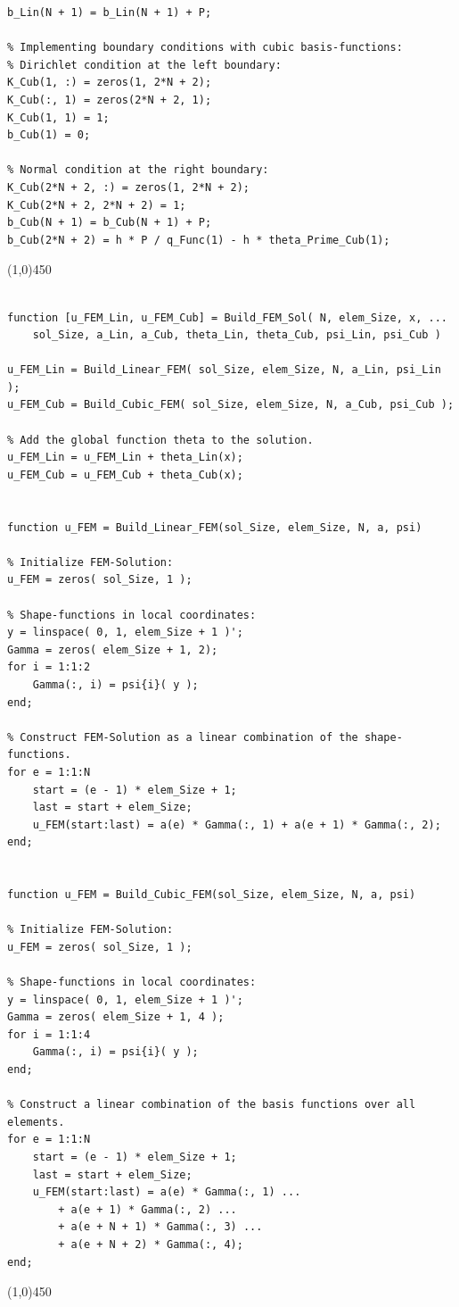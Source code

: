 \begin{lstlisting}[caption = {Setup Equation System}, label = lst:Setup_Eq_Sys]
% Normal condition at the right boundary:       
b_Lin(N + 1) = b_Lin(N + 1) + P;

% Implementing boundary conditions with cubic basis-functions:
% Dirichlet condition at the left boundary:
K_Cub(1, :) = zeros(1, 2*N + 2);
K_Cub(:, 1) = zeros(2*N + 2, 1);
K_Cub(1, 1) = 1;
b_Cub(1) = 0;

% Normal condition at the right boundary:
K_Cub(2*N + 2, :) = zeros(1, 2*N + 2);
K_Cub(2*N + 2, 2*N + 2) = 1;
b_Cub(N + 1) = b_Cub(N + 1) + P;
b_Cub(2*N + 2) = h * P / q_Func(1) - h * theta_Prime_Cub(1);

\end{lstlisting}
\line(1,0){450}
\clearpage

\begin{lstlisting}[caption = {Build up FEM-Solution}, label = lst:Build_Sol]

function [u_FEM_Lin, u_FEM_Cub] = Build_FEM_Sol( N, elem_Size, x, ...
    sol_Size, a_Lin, a_Cub, theta_Lin, theta_Cub, psi_Lin, psi_Cub )

u_FEM_Lin = Build_Linear_FEM( sol_Size, elem_Size, N, a_Lin, psi_Lin );
u_FEM_Cub = Build_Cubic_FEM( sol_Size, elem_Size, N, a_Cub, psi_Cub );

% Add the global function theta to the solution.
u_FEM_Lin = u_FEM_Lin + theta_Lin(x);
u_FEM_Cub = u_FEM_Cub + theta_Cub(x);


function u_FEM = Build_Linear_FEM(sol_Size, elem_Size, N, a, psi)

% Initialize FEM-Solution:
u_FEM = zeros( sol_Size, 1 );

% Shape-functions in local coordinates:
y = linspace( 0, 1, elem_Size + 1 )';
Gamma = zeros( elem_Size + 1, 2);
for i = 1:1:2
    Gamma(:, i) = psi{i}( y );
end;

% Construct FEM-Solution as a linear combination of the shape-functions.
for e = 1:1:N
    start = (e - 1) * elem_Size + 1;
    last = start + elem_Size;
    u_FEM(start:last) = a(e) * Gamma(:, 1) + a(e + 1) * Gamma(:, 2);
end;


function u_FEM = Build_Cubic_FEM(sol_Size, elem_Size, N, a, psi)

% Initialize FEM-Solution:
u_FEM = zeros( sol_Size, 1 );

% Shape-functions in local coordinates:
y = linspace( 0, 1, elem_Size + 1 )';
Gamma = zeros( elem_Size + 1, 4 );
for i = 1:1:4
    Gamma(:, i) = psi{i}( y );
end;

% Construct a linear combination of the basis functions over all elements.
for e = 1:1:N
    start = (e - 1) * elem_Size + 1;
    last = start + elem_Size;
    u_FEM(start:last) = a(e) * Gamma(:, 1) ...
        + a(e + 1) * Gamma(:, 2) ...
        + a(e + N + 1) * Gamma(:, 3) ...
        + a(e + N + 2) * Gamma(:, 4);
end;

\end{lstlisting}
\line(1,0){450}
\vspace{5 mm}


